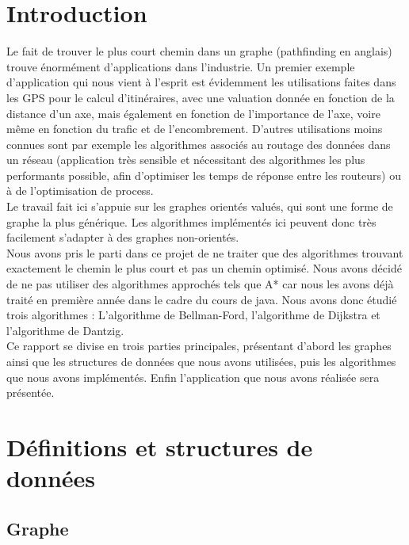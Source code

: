 \documentclass[a4paper,12pt,final] {article}
\begin{document}
\newpage

\setcounter{page}{2} 
\tableofcontents

\newpage

\section{Introduction}

Le fait de trouver le plus court chemin dans un graphe (pathfinding en anglais) trouve énormément d'applications dans l'industrie. Un premier exemple d'application qui nous vient à l'esprit est évidemment les utilisations faites dans les GPS pour le calcul d'itinéraires, avec une valuation donnée en fonction de la distance d'un axe, mais également en fonction de l'importance de l'axe, voire même en fonction du trafic et de l'encombrement. D'autres utilisations moins connues sont par exemple les algorithmes associés au routage des données dans un réseau (application très sensible et nécessitant des algorithmes les plus performants possible, afin d'optimiser les temps de réponse entre les routeurs) ou à de l'optimisation de process.\\

Le travail fait ici s'appuie sur les graphes orientés valués, qui sont une forme de graphe la plus générique. Les algorithmes implémentés ici peuvent donc très facilement s'adapter à des graphes non-orientés.\\

Nous avons pris le parti dans ce projet de ne traiter que des algorithmes trouvant exactement le chemin le plus court et pas un chemin optimisé. Nous avons décidé de ne pas utiliser des algorithmes approchés tels que A* car nous les avons déjà traité en première année dans le cadre du cours de java. Nous avons donc étudié trois algorithmes : L'algorithme de Bellman-Ford, l'algorithme de Dijkstra et l'algorithme de Dantzig.\\

Ce rapport se divise en trois parties principales, présentant d'abord les graphes ainsi que les structures de données que nous avons utilisées, puis les algorithmes que nous avons implémentés. Enfin l'application que nous avons réalisée sera présentée.

\newpage
\section{Définitions et structures de données}
\subsection{Graphe}
\end{document}
